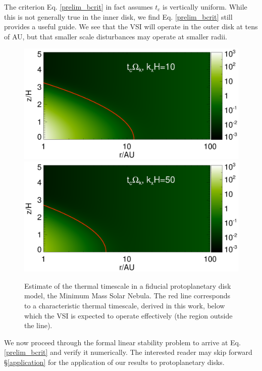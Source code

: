 \documentclass[iop]{emulateapj}
\begin{document}
The criterion Eq. \ref{prelim_bcrit} in fact
assumes $t_c$ is vertically uniform. While this is not generally true
in the inner disk, we find Eq. \ref{prelim_bcrit} still provides a
useful guide. We see that the VSI will operate in the outer 
disk at tens of AU, but that smaller scale disturbances may operate at
smaller radii. 

\begin{figure}
  \includegraphics[width=\linewidth,clip=true,trim=0cm 1.7cm 0cm
  0.73cm]{figures/bcrit_mmsn2d_kx10}
  \includegraphics[width=\linewidth,clip=true,trim=0cm 0.46cm 0cm
  0.73cm]{figures/bcrit_mmsn2d_kx50}
  \caption{Estimate of the thermal timescale  in a fiducial 
    protoplanetary disk model, the Minimum Mass Solar Nebula. The red
    line corresponds to a characteristic thermal timescale, derived in
    this work, below which the VSI is expected to operate effectively
    (the region outside the line).    
    \label{bcrit_mmsn2d} 
  }
\end{figure}

We now proceed through the formal linear stability problem to arrive
at Eq. \ref{prelim_bcrit} and verify it numerically. The interested 
reader may skip forward \S\ref{application} for the application of our
results to protoplanetary disks.     





 


\appendix




\end{document}
